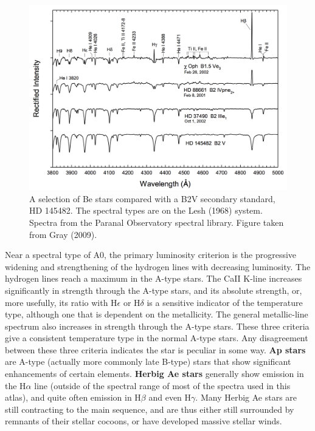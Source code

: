 \documentclass[a4paper,10pt]{article}
\begin{document}
\begin{figure}[h]
    \centering
    \includegraphics[width=14cm]{figures/Be.png}
    \caption{\footnotesize{A selection of Be stars compared with a B2V secondary standard, HD 145482. The spectral types are on the Lesh (1968) system. Spectra from the Paranal Observatory spectral library. Figure taken from Gray (2009).}}
    \label{fig:be}
\end{figure}

{\noindent}Near a spectral type of A0, the primary luminosity criterion is the progressive widening and strengthening of the hydrogen lines with decreasing luminosity. The hydrogen lines reach a maximum in the A-type stars. The CaII K-line increases significantly in strength through the A-type stars, and its absolute strength, or, more usefully, its ratio with H$\epsilon$ or H$\delta$ is a sensitive indicator of the temperature type, although one that is dependent on the metallicity. The general metallic-line spectrum also increases in strength through the A-type stars. These three criteria give a consistent temperature type in the normal A-type stars. Any disagreement between these three criteria indicates the star is peculiar in some way. \textbf{Ap stars} are A-type (actually more commonly late B-type) stars that show significant enhancements of certain elements. \textbf{Herbig Ae stars} generally show emission in the H$\alpha$ line (outside of the spectral range of most of the spectra used in this atlas), and quite often emission in H$\beta$ and even H$\gamma$. Many Herbig Ae stars are still contracting to the main sequence, and are thus either still surrounded by remnants of their stellar cocoons, or have developed massive stellar winds.
\end{document}
